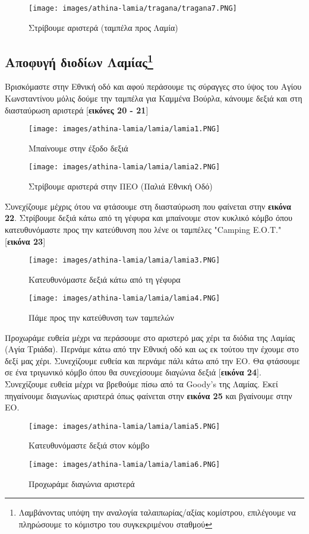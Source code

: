 \begin{figure}[H]
		\texttt{[image: images/athina-lamia/tragana/tragana7.PNG]}
			\caption{Στρίβουμε αριστερά (ταμπέλα προς Λαμία)}
\end{figure}
\newpage
\begin{center}
\section*{Αποφυγή διοδίων Λαμίας\footnote{Λαμβάνοντας υπόψη την αναλογία ταλαιπωρίας/αξίας κομίστρου, επιλέγουμε να πληρώσουμε το κόμιστρο του συγκεκριμένου σταθμού}}
\end{center}
Βρισκόμαστε στην Εθνική οδό και αφού περάσουμε τις σύραγγες στο ύψος του Αγίου Κωνσταντίνου μόλις δούμε την ταμπέλα για Καμμένα Βούρλα, κάνουμε δεξιά και στη διασταύρωση αριστερά [\textbf{εικόνες 20 - 21}]
		
\begin{figure}[H]
	\centering
		\texttt{[image: images/athina-lamia/lamia/lamia1.PNG]}
			\caption{Μπαίνουμε στην έξοδο δεξιά}

	\centering
		\texttt{[image: images/athina-lamia/lamia/lamia2.PNG]}
			\caption{Στρίβουμε αριστερά στην ΠΕΟ (Παλιά Εθνική Οδό)}
\end{figure}
Συνεχίζουμε μέχρις ότου να φτάσουμε στη διασταύρωση που φαίνεται στην \textbf{εικόνα 22}. Στρίβουμε δεξιά κάτω από τη γέφυρα και μπαίνουμε στον κυκλικό κόμβο όπου κατευθυνόμαστε προς την κατεύθυνση που λένε οι ταμπέλες "Camping Ε.Ο.Τ." [\textbf{εικόνα 23}]
\begin{figure}[H]
	\centering
		\texttt{[image: images/athina-lamia/lamia/lamia3.PNG]}
			\caption{Κατευθυνόμαστε δεξιά κάτω από τη γέφυρα\newline}
	
	\centering
		\texttt{[image: images/athina-lamia/lamia/lamia4.PNG]}
			\caption{Πάμε προς την κατεύθυνση των ταμπελών}
\end{figure}
Προχωράμε ευθεία μέχρι να περάσουμε στο αριστερό μας χέρι τα διόδια της Λαμίας (Αγία Τριάδα). Περνάμε κάτω από την Εθνική οδό και ως εκ τούτου την έχουμε στο δεξί μας χέρι. Συνεχίζουμε ευθεία και περνάμε πάλι κάτω από την ΕΟ. Θα φτάσουμε σε ένα τριγωνικό κόμβο όπου θα συνεχίσουμε διαγώνια δεξιά [\textbf{εικόνα 24}]. Συνεχίζουμε ευθεία μέχρι να βρεθούμε πίσω από τα Goody's της Λαμίας. Εκεί πηγαίνουμε διαγωνίως αριστερά όπως φαίνεται στην \textbf{εικόνα 25} και βγαίνουμε στην ΕΟ.
\begin{figure}[H]
	\centering
		\texttt{[image: images/athina-lamia/lamia/lamia5.PNG]}
			\caption{Κατευθυνόμαστε δεξιά στον κόμβο}
	
	\centering
		\texttt{[image: images/athina-lamia/lamia/lamia6.PNG]}
			\caption{Προχωράμε διαγώνια αριστερά}
\end{figure}

